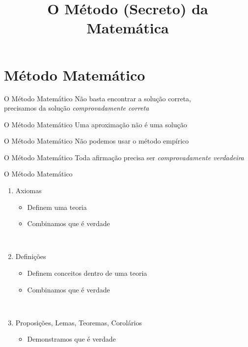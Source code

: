 \documentclass[fleqn,utf8,aspectratio=169,12pt,ignorenonframetext]{beamer}
\title{O Método (Secreto) da Matemática}
\begin{document}
\addtitle

\section{Método Matemático}

\begin{frame}{O Método Matemático}
  Não basta encontrar a solução correta, \\[2mm]
  precisamos da solução \emph{comprovadamente correta}
\end{frame}

\begin{frame}{O Método Matemático}
  Uma aproximação não é uma solução
\end{frame}

\begin{frame}{O Método Matemático}
  Não podemos usar o método empírico
\end{frame}

\begin{frame}{O Método Matemático}
  Toda afirmação precisa ser \emph{comprovadamente verdadeira}
\end{frame}

\begin{frame}{O Método Matemático}
  \begin{enumerate}[<+->]
    \item Axiomas
    \begin{itemize}
      \item Definem uma teoria
      \item Combinamos que é verdade
    \end{itemize}
    ~

    \item Definições
    \begin{itemize}
      \item Definem conceitos dentro de uma teoria
      \item Combinamos que é verdade
    \end{itemize}
    ~

    \item Proposições, Lemas, Teoremas, Corolários
    \begin{itemize}
      \item Demonstramos que é verdade
    \end{itemize}
  \end{enumerate}
\end{frame}
\end{document}
